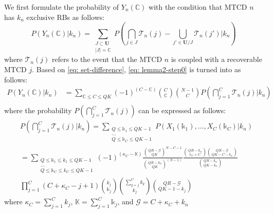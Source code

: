 \documentclass[a4paper]{IEEEtran}
\begin{document}
We first formulate the probability of $Y_n(\mathbb{C})$ with the condition that MTCD $n$ has $k_n$ exclusive RBs as follows:
\begin{equation}
P(Y_n(\mathbb{C}) | k_n) = 
\sum\limits_{\substack{
J \subset \pmb{U} \\
|J| = \mathbb{C}
}}
P(\bigcap_{j \in J} \mathcal{T}_{n}(j) - \bigcup_{j' \in \pmb{U}/J} \mathcal{T}_{n}(j') | k_n)
\label{eq: lemma2-step0}
\end{equation}
where $\mathcal{T}_{n}(j)$ refers to the event that the MTCD $n$ is coupled with a recoverable MTCD $j$. Based on \eqref{eq: set-difference}, \eqref{eq: lemma2-step0} is turned into as follows:
\begin{equation}
\begin{split}
P(Y_n(\mathbb{C}) | k_n) &= \sum_{\mathbb{C} \leq C \leq QK}(-1)^{(C - \mathbb{C})}
{C \choose \mathbb{C}} 
{N - 1 \choose C}
P(\bigcap^{C}_{j = 1} \mathcal{T}_{n}(j) | k_n)\\
\end{split}
\label{eq: lemma2-step1}
\end{equation}
where the probability $P(\bigcap^{C}_{j = 1} \mathcal{T}_{n}(j))$ can be expressed as follows:
\begin{equation}
\begin{split}
&P(\bigcap^{C}_{j = 1} \mathcal{T}_{n}(j) | k_n) = 
\sum\limits_{
\substack{
Q \leq \mathbb{k}_1 \leq QK - 1\\ 
\dots\\
Q \leq \mathbb{k}_C \leq QK - 1
}}
P(X_1(\mathbb{k}_1), \dots, X_C(\mathbb{k}_C)| k_n)\\
&=
\sum\limits_{
\substack{
Q \leq \mathbb{k}_1 \leq k_1 \leq QK - 1\\ 
\dots\\
Q \leq \mathbb{k}_C \leq k_C \leq QK - 1
}} (-1)^{(\kappa_{C} - \mathbb{K})}
\frac{{QR - \mathcal{G} \choose QK}^{N - C - 1} }
{ {QR - k_n \choose QK}^{(N-1)}}
\frac{{QR - k_n \choose \kappa_C + C} {QR - \mathcal{G}\choose QK - C - k_n}}
{ {QR - k_n \choose QK - k_n} } 
\\
&
\prod^{C}_{j = 1} 
(C + \kappa_C - j + 1) 
{ k_j \choose \mathbb{k}_j} 
{\sum^{C}_{q = j} k_q \choose k_j} 
{QR - \mathcal{G} \choose QK - 1 - k_j}
\end{split}
\label{eq: lemma2-step2}
\end{equation}
where $\kappa_C = \sum^{C}_{j = 1}k_j$, $\mathbb{K} = \sum^{C}_{j = 1}\mathbb{k}_j$, and $\mathcal{G} = C + \kappa_{C} + k_n$
\end{document}
